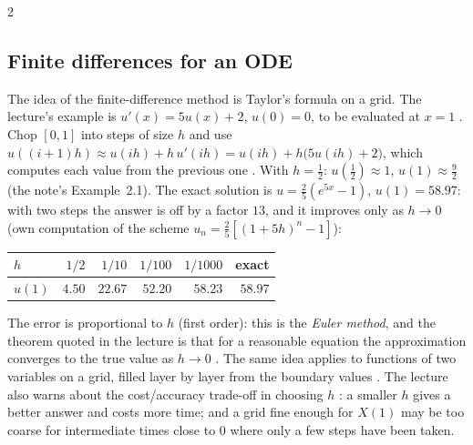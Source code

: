 \begin{paracol}{2}
\subsection{Finite differences for an ODE}
The idea of the finite-difference method is Taylor's formula on a grid. The lecture's example is $u'(x)=5u(x)+2$, $u(0)=0$, to be evaluated at $x=1$ . Chop $[0,1]$ into steps of size $h$ and use $u((i+1)h)\approx u(ih)+h\,u'(ih)=u(ih)+h\bigl(5u(ih)+2\bigr)$, which computes each value from the previous one . With $h=\tfrac12$: $u(\tfrac12)\approx1$, $u(1)\approx\tfrac92$ (the note's Example~2.1). The exact solution is $u=\tfrac25(e^{5x}-1)$, $u(1)=58.97$: with two steps the answer is off by a factor $13$, and it improves only as $h\to0$ (own computation of the scheme $u_n=\tfrac25[(1+5h)^n-1]$):
\begin{center}
\small
\begin{tabular}{@{}lrrrrr@{}}
\toprule
$h$ & $1/2$ & $1/10$ & $1/100$ & $1/1000$ & exact\\
\midrule
$u(1)$ & $4.50$ & $22.67$ & $52.20$ & $58.23$ & $58.97$\\
\bottomrule
\end{tabular}
\end{center}
The error is proportional to $h$ (first order): this is the \emph{Euler method}, and the theorem quoted in the lecture is that for a reasonable equation the approximation converges to the true value as $h\to0$ . The same idea applies to functions of two variables on a grid, filled layer by layer from the boundary values . The lecture also warns about the cost/accuracy trade-off in choosing $h$ : a smaller $h$ gives a better answer and costs more time; and a grid fine enough for $X(1)$ may be too coarse for intermediate times close to $0$ where only a few steps have been taken.


\end{paracol}
